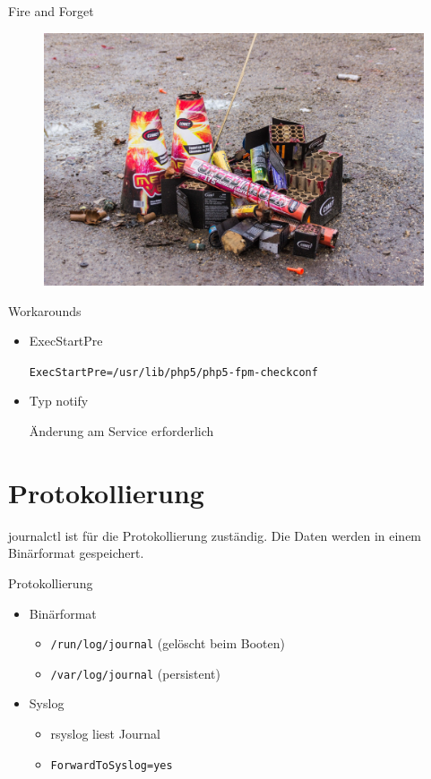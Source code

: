 \begin{frame}{Fire and Forget}
  \begin{figure}[!ht]
      \centering
      \includegraphics[width=0.9\linewidth]{img/fireworks-1156808_1920.jpg}
   \end{figure}
\end{frame}

\begin{frame}[fragile]{Workarounds}
  \begin{itemize}
     \item ExecStartPre

\verb|ExecStartPre=/usr/lib/php5/php5-fpm-checkconf|

     \item Typ notify

	Änderung am Service erforderlich
  \end{itemize}
\end{frame}

\section{Protokollierung}

journalctl ist für die Protokollierung zuständig. Die Daten werden in einem Binärformat gespeichert.

\begin{frame}[fragile]{Protokollierung}
\begin{itemize}
\item Binärformat
\begin{itemize}
\item \verb|/run/log/journal| (gelöscht beim Booten)
\item \verb|/var/log/journal| (persistent)
\end{itemize}
\item Syslog
	\begin{itemize}
	\item rsyslog liest Journal
	\item \verb|ForwardToSyslog=yes|
	\end{itemize}
\end{itemize}
\end{frame}


